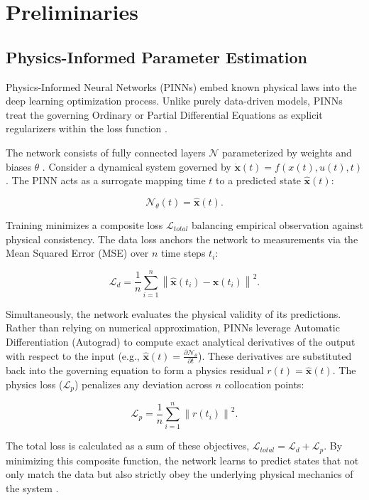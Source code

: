 \section{Preliminaries}

\subsection{Physics-Informed Parameter Estimation}
Physics-Informed Neural Networks (PINNs) embed known physical laws into the
deep learning optimization process. Unlike purely data-driven models, PINNs
treat the governing Ordinary or Partial Differential Equations as explicit
regularizers within the loss function \cite{raissi2019physics,mojgani_kolmogorov_2023}.

The network consists of fully connected layers $\mathcal{N}$ parameterized by
weights and biases $\theta$ \cite{raissi2019physics}. Consider a dynamical system governed by $\dot{\mathbf{x}}(t) = f(x(t), u(t), t)$. The PINN acts
as a surrogate mapping time $t$ to a predicted state $\hat{\mathbf{x}}(t)$:

\begin{equation}
    \mathcal{N}_{\theta}(t) = \hat{\mathbf{x}}(t).
\end{equation}

\noindent Training minimizes a composite loss $\mathcal{L}_{total}$ balancing
empirical observation against physical consistency. The data loss anchors the
network to measurements via the Mean Squared Error (MSE) over $n$ time steps
$t_i$:

\begin{equation}
    \mathcal{L}_{d} = \frac{1}{n} \sum_{i=1}^{n}
    \left\lVert \hat{\mathbf{x}}(t_i) - \mathbf{x}(t_i) \right\rVert^2 .
\end{equation}

Simultaneously, the network evaluates the physical validity of its predictions. Rather than relying on numerical approximation, PINNs leverage Automatic Differentiation (Autograd) to compute exact analytical derivatives of the output with respect to the input (e.g., $\hat{\mathbf{x}}(t) = \frac{\partial \mathcal{N}_{\theta}}{\partial t}$). These derivatives are substituted back into the governing equation to form a physics residual $r(t) = \hat{\mathbf{x}}(t)$. The physics loss ($\mathcal{L}_{p}$) penalizes any deviation across $n$ collocation points:

\begin{equation}
    \mathcal{L}_{p} = \frac{1}{n} \sum_{i=1}^{n} \left\lVert r(t_i) \right\rVert^2 .
\end{equation}

The total loss is calculated as a sum of these objectives, $\mathcal{L}_{total} = \mathcal{L}_{d} + \mathcal{L}_{p}$. By minimizing this composite function, the network learns to predict states that not only match the data but also strictly obey the underlying physical mechanics of the system \cite{mojgani_kolmogorov_2023}.
